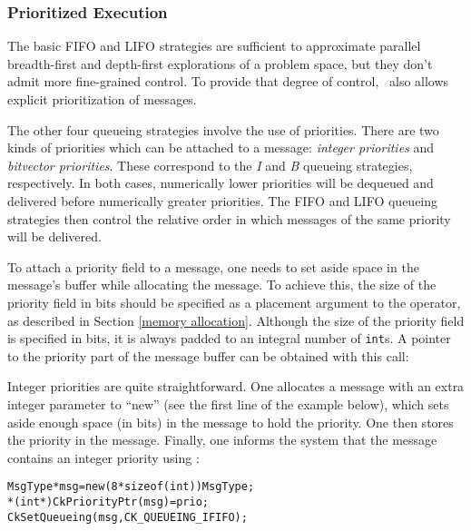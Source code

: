\subsubsection{Prioritized Execution}
\label{prioritized message passing}

The basic FIFO and LIFO strategies are sufficient to approximate
parallel breadth-first and depth-first explorations of a problem
space, but they don't admit more fine-grained control. To provide that
degree of control, \charmpp\ also allows explicit prioritization of
messages.

The other four queueing strategies involve the use of
priorities.  There are two kinds of priorities which
can be attached to a message: {\sl integer priorities} and {\sl bitvector priorities}. These correspond to the {\em I} and {\em B} queueing
strategies, respectively. In both cases, numerically lower priorities
will be dequeued and delivered before numerically greater
priorities. The FIFO and LIFO queueing strategies then control the
relative order in which messages of the same priority will be
delivered.

To attach a priority field to a
message, one needs to set aside space in the message's buffer while
allocating the message.  To achieve this, the
size of the priority field in bits should be
specified as a placement argument to the  operator, as
described in Section \ref{memory allocation}.  Although the size of
the priority field is specified in bits, it is always padded to an
integral number of {\tt int}s.  A pointer to the priority part of the
message buffer can be obtained with this call:


Integer priorities are quite straightforward.  One allocates a message
with an extra integer parameter to ``new'' (see the first line of the
example below), which sets aside enough space (in bits) in the message
to hold the priority.  One then stores the priority in the message.
Finally, one informs the system that the message contains an integer
priority using :

\begin{alltt}
  MsgType *msg = new (8*sizeof(int)) MsgType;
  *(int*)CkPriorityPtr(msg) = prio;
  CkSetQueueing(msg, CK_QUEUEING_IFIFO);
\end{alltt}

